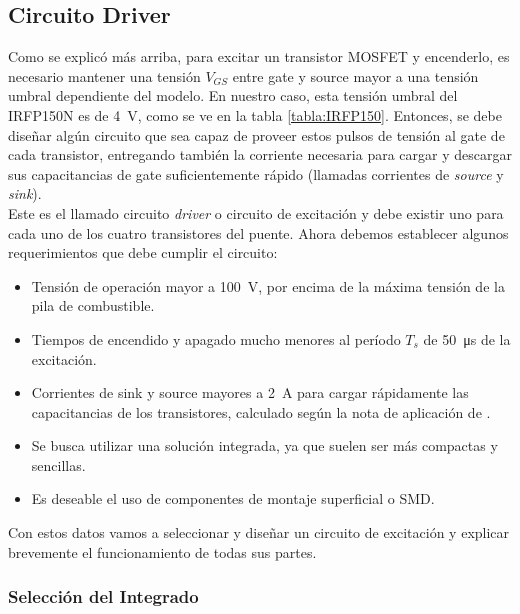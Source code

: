 \subsection{Circuito Driver}

Como se explicó más arriba, para excitar un transistor MOSFET y encenderlo, es necesario mantener una tensión $V_{GS}$ entre gate y source mayor a una tensión umbral dependiente del modelo. En nuestro caso, esta tensión umbral del IRFP150N es de \SI[]{4}[]{\volt}, como se ve en la tabla \ref{tabla:IRFP150}. Entonces, se debe diseñar algún circuito que sea capaz de proveer estos pulsos de tensión al gate de cada transistor, entregando también la corriente necesaria para cargar y descargar sus capacitancias de gate suficientemente rápido (llamadas corrientes de \textit{source} y \textit{sink}).\\

Este es el llamado {\Medium circuito \textit{driver}} o {\Medium circuito de excitación} y debe existir uno para cada uno de los cuatro transistores del puente. Ahora debemos establecer algunos requerimientos que debe cumplir el circuito:\\

\begin{itemize}
    \item Tensión de operación mayor a \SI[]{100}[]{\volt}, por encima de la máxima tensión de la pila de combustible.
    \item Tiempos de encendido y apagado mucho menores al período $T_s$ de \SI[]{50}[]{\micro\second} de la excitación.
    \item Corrientes de sink y source mayores a \SI[]{2}[]{\ampere} para cargar rápidamente las capacitancias de los transistores, calculado según la nota de aplicación de \cite{SinkSourceCurrent}.
    \item Se busca utilizar una solución integrada, ya que suelen ser más compactas y sencillas.
    \item Es deseable el uso de componentes de montaje superficial o SMD.\\
\end{itemize}

Con estos datos vamos a seleccionar y diseñar un circuito de excitación y explicar brevemente el funcionamiento de todas sus partes.\\

\subsubsection{Selección del Integrado}

